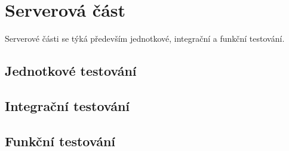 \section{Serverová část}\label{sec:testing-server}

Serverové části se týká především jednotkové, integrační a funkční testování.



\subsection{Jednotkové testování}\label{subsec:testing-server-unit}



\subsection{Integrační testování}\label{subsec:testing-server-integration}



\subsection{Funkční testování}\label{subsec:testing-server-functional}
